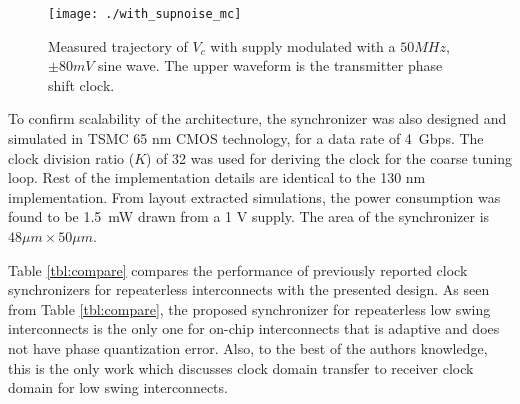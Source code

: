 \documentclass[journal,twoside,letterpaper]{IEEEtran}
\begin{document}
\begin{figure}[h!]
\centering
\texttt{[image: ./with\_supnoise\_mc]}
\caption{Measured trajectory of $V_c$ with supply modulated with
a $50MHz$, $\pm 80mV$ sine wave. The upper waveform is the 
transmitter phase shift clock.}
\label{fig:withnoise}
\end{figure}

To confirm scalability of the architecture,
the synchronizer was also designed and simulated in TSMC 65 nm CMOS technology,
for a data rate of \mbox{4 Gbps}.
The clock division ratio ($K$) of 32 was used for
deriving the clock for the coarse tuning loop. Rest of the implementation details
are identical to the 130 nm implementation.
From layout extracted simulations, the power consumption was found to be
\mbox{1.5 mW} drawn from a 1 V supply. The area of the synchronizer is 
\mbox{$48\mu m\times 50\mu m$}.

Table \ref{tbl:compare} compares the performance of 
previously reported clock synchronizers for repeaterless interconnects
with the presented design.
As seen from Table \ref{tbl:compare}, the proposed 
synchronizer for repeaterless low swing interconnects 
is the only one for on-chip interconnects
that is adaptive and does not have phase quantization error. 
Also, to the best of the authors knowledge, 
this is the only work which discusses clock domain transfer to receiver
clock domain for low swing interconnects.
\end{document}
